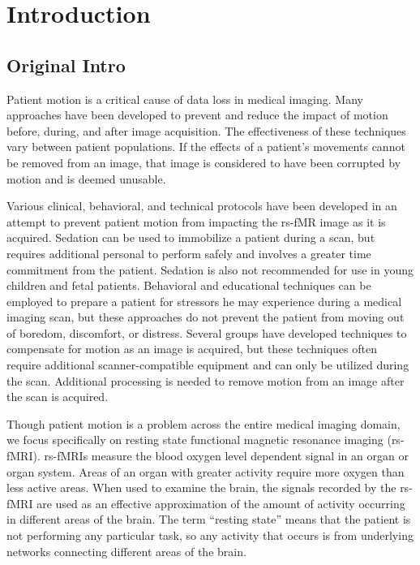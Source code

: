 \chapter{Introduction}
\label{ch:intro}

\section{Original Intro}

Patient motion is a critical cause of data loss in medical imaging. Many approaches have been developed to prevent and reduce the impact of motion before, during, and after image acquisition. The effectiveness of these techniques vary between patient populations. If the effects of a patient's movements cannot be removed from an image, that image is considered to have been corrupted by motion and is deemed unusable.

Various clinical, behavioral, and technical protocols have been developed in an attempt to prevent patient motion from impacting the rs-fMR image as it is acquired. Sedation can be used to immobilize a patient during a scan, but requires additional personal to perform safely and involves a greater time commitment from the patient. Sedation is also not recommended for use in young children and fetal patients. Behavioral and educational techniques can be employed to prepare a patient for stressors he may experience during a medical imaging scan, but these approaches do not prevent the patient from moving out of boredom, discomfort, or distress. Several groups have developed techniques to compensate for motion as an image is acquired, but these techniques often require additional scanner-compatible equipment and can only be utilized during the scan. Additional processing is needed to remove motion from an image after the scan is acquired.

Though patient motion is a problem across the entire medical imaging domain, we focus specifically on resting state functional magnetic resonance imaging (rs-fMRI). rs-fMRIs measure the blood oxygen level dependent signal in an organ or organ system. Areas of an organ with greater activity require more oxygen than less active areas. When used to examine the brain, the signals recorded by the rs-fMRI are used as an effective approximation of the amount of activity occurring in different areas of the brain. The term ``resting state'' means that the patient is not performing any particular task, so any activity that occurs is from underlying networks connecting different areas of the brain. 

